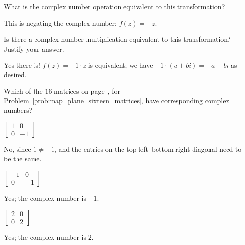 \documentclass[../key.tex]{subfiles}
\begin{document}
\begin{inner_problem}
\item What is the complex number operation equivalent to this transformation?
\end{inner_problem}

This is negating the complex number: $f(z) = -z$.

\begin{inner_problem}
\item Is there a complex number multiplication equivalent to this transformation? Justify your answer.
\end{inner_problem}

Yes there is! $f(z) = -1\cdot z$ is equivalent; we have $-1 \cdot (a+bi) = -a-bi$ as desired.

\begin{outer_problem}
\item
\end{outer_problem}

\newcommand{\mtrxtbt}[4] {$\left[\begin{array}{cc}#1 & #2 \\ #3 & #4 \end{array}\right]$}

\begin{inner_problem}[start=1]
\item Which of the $16$ matrices on page~\pageref{prob:map_plane_sixteen_matrices}, for Problem~\ref{prob:map_plane_sixteen_matrices}, have corresponding complex numbers?
\end{inner_problem}

\begin{iinner_problem}[start=1]
\item \mtrxtbt{1}{0}{0}{-1}
\end{iinner_problem}

No, since $1\neq -1$, and the entries on the top left--bottom right diagonal need to be the same.

\begin{iinner_problem}
\item \mtrxtbt{-1}{0}{0}{-1}
\end{iinner_problem}

Yes; the complex number is $-1$.

\begin{iinner_problem}
\item \mtrxtbt{2}{0}{0}{2}
\end{iinner_problem}

Yes; the complex number is $2$.
\end{document}
